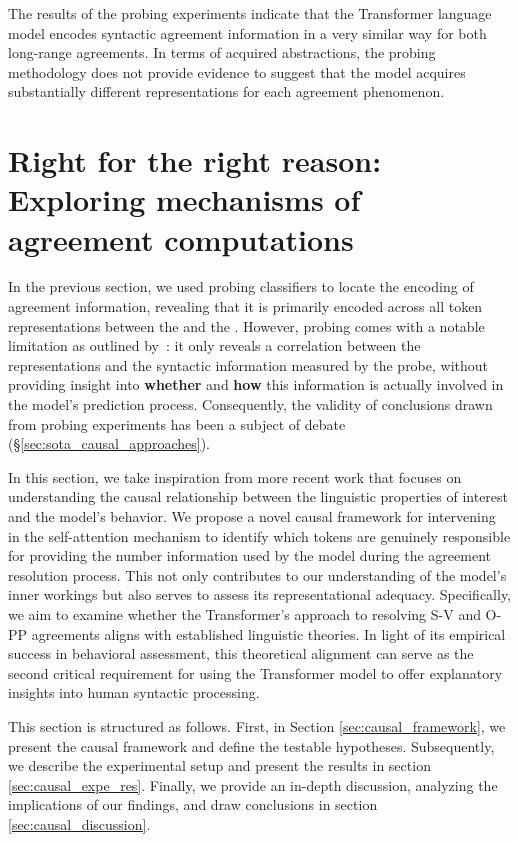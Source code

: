  
The results of the probing experiments indicate that the Transformer
language model encodes syntactic agreement information in a very similar way
for both long-range agreements. In terms of acquired
abstractions, the probing methodology does not provide evidence to suggest that the model acquires substantially different representations for
each agreement phenomenon.


\section{Right for the right reason: Exploring mechanisms of agreement computations}\label{sec:causal}

In the previous section, we used probing classifiers to locate the encoding of agreement information, revealing that it is primarily encoded across all token representations between the \cue and the \target. However, probing comes with a notable limitation as outlined by~\cite{belinkov-glass-2019-analysis}: it only reveals a correlation between the representations and the syntactic information measured by the probe, without providing insight into \textbf{whether} and \textbf{how} this information is actually involved in the model's prediction process. Consequently, the validity of conclusions drawn from probing experiments has been a subject of debate (\S\ref{sec:sota_causal_approaches}).

In this section, we take inspiration from more recent work  that focuses on understanding the causal relationship between the linguistic properties of interest and the model's behavior. We propose a novel causal framework for intervening in the self-attention mechanism to identify which tokens are genuinely responsible for providing the number information used by the model during the agreement resolution process. This not only contributes to our understanding of the model's inner workings but also serves to assess its representational adequacy. Specifically, we aim to examine whether the Transformer's approach to resolving S-V and O-PP agreements aligns with established linguistic theories. In light of its empirical success in behavioral assessment, this theoretical alignment can serve as the second critical requirement for using the Transformer model to offer explanatory insights into human syntactic processing.


This section is structured as follows. First, in Section \ref{sec:causal_framework}, we present the causal framework and define the testable hypotheses. Subsequently, we describe the experimental setup and present the results in section \ref{sec:causal_expe_res}. Finally, we provide an in-depth discussion, analyzing the implications of our findings, and draw conclusions in section \ref{sec:causal_discussion}.

